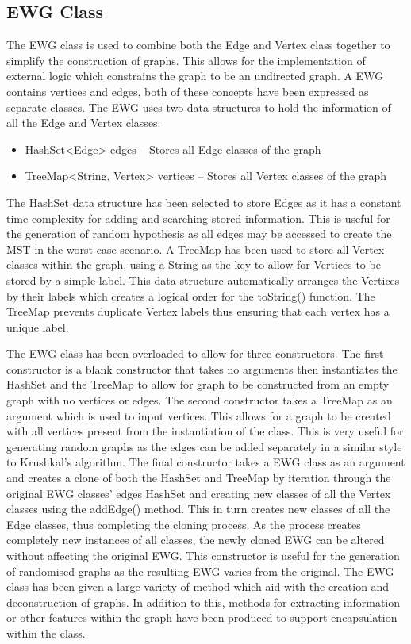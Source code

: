 \documentclass{AISB2008}
\begin{document}
\subsection{EWG Class}

The EWG class is used to combine both the Edge and Vertex class together to simplify the construction of graphs. This allows for the implementation of external logic which constrains the graph to be an undirected graph.
A EWG contains vertices and edges, both of these concepts have been expressed as separate classes. The EWG uses two data structures to hold the information of all the Edge and Vertex classes:

\begin{itemize}
\item HashSet<Edge> edges – Stores all Edge classes of the graph
\item TreeMap<String, Vertex> vertices – Stores all Vertex classes of the graph
\end{itemize}

The HashSet data structure has been selected to store Edges as it has a constant time complexity for adding and searching stored information. This is useful for the generation of random hypothesis as all edges may be accessed to create the MST in the worst case scenario.
A TreeMap has been used to store all Vertex classes within the graph, using a String as the key to allow for Vertices to be stored by a simple label. This data structure automatically arranges the Vertices by their labels which creates a logical order for the toString() function. The TreeMap prevents duplicate Vertex labels thus ensuring that each vertex has a unique label.

The EWG class has been overloaded to allow for three constructors. The first constructor is a blank constructor that takes no arguments then instantiates the HashSet and the TreeMap to allow for graph to be constructed from an empty graph with no vertices or edges. The second constructor takes a TreeMap as an argument which is used to input vertices. This allows for a graph to be created with all vertices present from the instantiation of the class. This is very useful for generating random graphs as the edges can be added separately in a similar style to Krushkal’s algorithm. The final constructor takes a EWG class as an argument and creates a clone of both the HashSet and TreeMap by iteration through the original EWG classes’ edges HashSet and creating new classes of all the Vertex classes using the addEdge() method. This in turn creates new classes of all the Edge classes, thus completing the cloning process. As the process creates completely new instances of all classes, the newly cloned EWG can be altered without affecting the original EWG. This constructor is useful for the generation of randomised graphs as the resulting EWG varies from the original.
The EWG class has been given a large variety of method which aid with the creation and deconstruction of graphs. In addition to this, methods for extracting information or other features within the graph have been produced to support encapsulation within the class.
\end{document}
